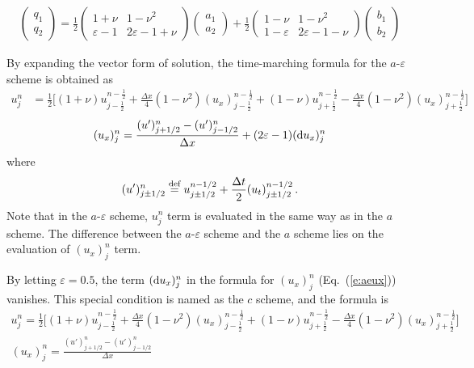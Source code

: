 \documentclass{turgon}
\begin{document}
\begin{align*}
  \left(\begin{array}{c} q_1 \\ q_2 \end{array}\right)
    = \frac{1}{2}\left(\begin{array}{cc} 1+\nu & 1-\nu^2 \\
      \varepsilon-1 & 2\varepsilon-1+\nu \end{array}\right)
      \left(\begin{array}{c} a_1 \\ a_2 \end{array}\right)
    + \frac{1}{2}\left(\begin{array}{cc} 1-\nu & 1-\nu^2 \\
      1-\varepsilon & 2\varepsilon - 1 - \nu \end{array}\right)
  \left(\begin{array}{c} b_1 \\ b_2 \end{array}\right)
\end{align*}

By expanding the vector form of solution, the time-marching formula for
the $a$-$\varepsilon$ scheme is obtained as
\begin{align}
  u_j^n &= \frac{1}{2}\Big[
      (1+\nu)u_{j-\frac{1}{2}}^{n-\frac{1}{2}}
    + \frac{\Delta x}{4}(1-\nu^2)(u_x)_{j-\frac{1}{2}}^{n-\frac{1}{2}}
    + (1-\nu)u_{j+\frac{1}{2}}^{n-\frac{1}{2}}
    - \frac{\Delta x}{4}(1-\nu^2)(u_x)_{j+\frac{1}{2}}^{n-\frac{1}{2}}
  \Big] \label{e:aeu}
\end{align}
\begin{align}
  (u_x)_j^n = \frac{(u')_{j+1/2}^n - (u')_{j-1/2}^n}{\Delta x}
            + (2\varepsilon-1)(\mathop{}\!\mathrm{d} u_x)_j^n \label{e:aeux}
\end{align}
where
\begin{align*}
  (u')_{j\pm1/2}^n \defeq
    u_{j\pm1/2}^{n-1/2}+\frac{\Delta t}{2}(u_t)_{j\pm1/2}^{n-1/2}\,.
\end{align*}
Note that in the $a$-$\varepsilon$ scheme, $u_j^n$ term is evaluated in the
same way as in the $a$ scheme.  The difference between the $a$-$\varepsilon$
scheme and the $a$ scheme lies on the evaluation of $(u_x)_j^n$ term.

By letting $\varepsilon=0.5$, the term $(\mathop{}\!\mathrm{d} u_x)_j^n$ in the formula for
$(u_x)_j^n$ (Eq.~(\ref{e:aeux})) vanishes.  This special condition is named as
the $c$ scheme, and the formula is
\begin{gather}
  u_j^n = \frac{1}{2}\Big[
      (1+\nu)u_{j-\frac{1}{2}}^{n-\frac{1}{2}}
    + \frac{\Delta x}{4}(1-\nu^2)(u_x)_{j-\frac{1}{2}}^{n-\frac{1}{2}}
    + (1-\nu)u_{j+\frac{1}{2}}^{n-\frac{1}{2}}
    - \frac{\Delta x}{4}(1-\nu^2)(u_x)_{j+\frac{1}{2}}^{n-\frac{1}{2}}
  \Big] \label{e:cu} \\
  (u_x)_j^n = \frac{(u')_{j+1/2}^n - (u')_{j-1/2}^n}{\Delta x}
  \label{e:cux}
\end{gather}
\end{document}
